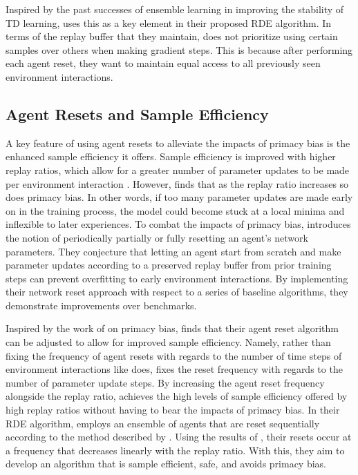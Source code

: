 \documentclass[base]{subfiles}
\begin{document}
Inspired by the past successes of ensemble learning in improving the stability of TD learning, \cite{kim2023} uses this as a key element in their proposed RDE algorithm. 
In terms of the replay buffer that they maintain, \cite{kim2023} does not prioritize using certain samples over others when making gradient steps. 
This is because after performing each agent reset, they want to maintain equal access to all previously seen environment interactions. 

\subsection{Agent Resets and Sample Efficiency}

A key feature of using agent resets to alleviate the impacts of primacy bias is the enhanced sample efficiency it offers. 
Sample efficiency is improved with higher replay ratios, which allow for a greater number of parameter updates to be made per environment interaction \cite{fedus2020, hasselt2019}.
However, \cite{nikishin2022} finds that as the replay ratio increases so does primacy bias.
In other words, if too many parameter updates are made early on in the training process, the model could become stuck at a local minima and inflexible to later experiences.
To combat the impacts of primacy bias, \cite{nikishin2022} introduces the notion of periodically partially or fully resetting an agent's network parameters.
They conjecture that letting an agent start from scratch and make parameter updates according to a preserved replay buffer from prior training steps can prevent overfitting to early environment interactions. 
By implementing their network reset approach with respect to a series of baseline algorithms, they demonstrate improvements over benchmarks.

Inspired by the work of \cite{nikishin2022} on primacy bias, \cite{doro2023} finds that their agent reset algorithm can be adjusted to allow for improved sample efficiency. 
Namely, rather than fixing the frequency of agent resets with regards to the number of time steps of environment interactions like \cite{nikishin2022} does, \cite{doro2023} fixes the reset frequency with regards to the number of parameter update steps.
By increasing the agent reset frequency alongside the replay ratio, \cite{doro2023} achieves the high levels of sample efficiency offered by high replay ratios without having to bear the impacts of primacy bias.
In their RDE algorithm, \cite{kim2023} employs an ensemble of agents that are reset sequentially according to the method described by \cite{nikishin2022}.
Using the results of \cite{doro2023}, their resets occur at a frequency that decreases linearly with the replay ratio. 
With this, they aim to develop an algorithm that is sample efficient, safe, and avoids primacy bias.
\end{document}
